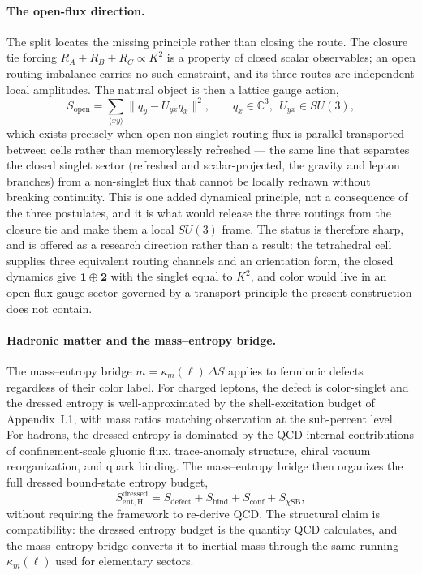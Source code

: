 \documentclass[11pt]{article}
\begin{document}
\paragraph{The open-flux direction.}
The split locates the missing principle rather than closing the route. The closure tie forcing $R_A+R_B+R_C\propto K^2$ is a property of closed scalar observables; an open routing imbalance carries no such constraint, and its three routes are independent local amplitudes. The natural object is then a lattice gauge action,
\[
S_{\mathrm{open}}=\sum_{\langle xy\rangle}\bigl\|q_y-U_{yx}q_x\bigr\|^2,\qquad q_x\in\mathbb C^3,\ \ U_{yx}\in SU(3),
\]
which exists precisely when open non-singlet routing flux is parallel-transported between cells rather than memorylessly refreshed --- the same line that separates the closed singlet sector (refreshed and scalar-projected, the gravity and lepton branches) from a non-singlet flux that cannot be locally redrawn without breaking continuity. This is one added dynamical principle, not a consequence of the three postulates, and it is what would release the three routings from the closure tie and make them a local $SU(3)$ frame. The status is therefore sharp, and is offered as a research direction rather than a result: the tetrahedral cell supplies three equivalent routing channels and an orientation form, the closed dynamics give $\mathbf1\oplus\mathbf2$ with the singlet equal to $K^2$, and color would live in an open-flux gauge sector governed by a transport principle the present construction does not contain.

\paragraph{Hadronic matter and the mass--entropy bridge.}
The mass--entropy bridge $m=\kappa_m(\ell)\,\Delta S$ applies to fermionic defects regardless of their color label. For charged leptons, the defect is color-singlet and the dressed entropy is well-approximated by the shell-excitation budget of Appendix~I.1, with mass ratios matching observation at the sub-percent level. For hadrons, the dressed entropy is dominated by the QCD-internal contributions of confinement-scale gluonic flux, trace-anomaly structure, chiral vacuum reorganization, and quark binding. The mass--entropy bridge then organizes the full dressed bound-state entropy budget,
\[
S_{\mathrm{ent,H}}^{\mathrm{dressed}}=S_{\mathrm{defect}}+S_{\mathrm{bind}}+S_{\mathrm{conf}}+S_{\chi\mathrm{SB}},
\]
without requiring the framework to re-derive QCD. The structural claim is compatibility: the dressed entropy budget is the quantity QCD calculates, and the mass--entropy bridge converts it to inertial mass through the same running $\kappa_m(\ell)$ used for elementary sectors.
\end{document}
